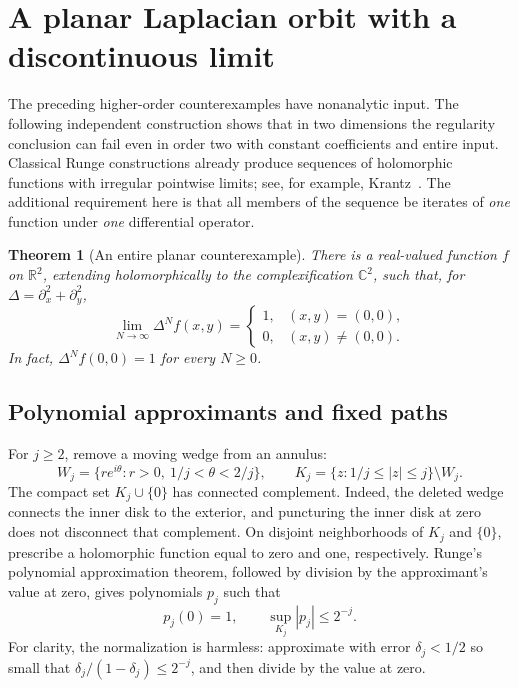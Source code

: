 \documentclass[11pt,reqno]{amsart}
\numberwithin{equation}{section}
\newtheorem{theorem}{Theorem}[section]
\theoremstyle{definition}
\theoremstyle{remark}
\newcommand{\R}{\mathbb R}
\newcommand{\C}{\mathbb C}
\begin{document}
\section{A planar Laplacian orbit with a discontinuous limit}\label{sec:plane}
The preceding higher-order counterexamples have nonanalytic input. The following independent construction shows that in two dimensions the regularity conclusion can fail even in order two with constant coefficients and entire input. Classical Runge constructions already produce sequences of holomorphic functions with irregular pointwise limits; see, for example, Krantz~\cite{krantz}. The additional requirement here is that all members of the sequence be iterates of \emph{one} function under \emph{one} differential operator.

\begin{theorem}[An entire planar counterexample]\label{thm:plane}
There is a real-valued function $f$ on $\R^2$, extending holomorphically to the complexification $\C^2$, such that, for $\Delta=\partial_x^2+\partial_y^2$,
\begin{equation}\label{eq:spike}
 \lim_{N\to\infty}\Delta^Nf(x,y)
 =\begin{cases}
 1,&(x,y)=(0,0),\\
 0,&(x,y)\ne(0,0).
 \end{cases}
\end{equation}
In fact, $\Delta^Nf(0,0)=1$ for every $N\ge0$.
\end{theorem}

\subsection{Polynomial approximants and fixed paths}
For $j\ge2$, remove a moving wedge from an annulus:
\[
 W_j=\{re^{i\theta}:r>0,\ 1/j<\theta<2/j\},\qquad
 K_j=\{z:1/j\le |z|\le j\}\setminus W_j.
\]
The compact set $K_j\cup\{0\}$ has connected complement. Indeed, the deleted wedge connects the inner disk to the exterior, and puncturing the inner disk at zero does not disconnect that complement. On disjoint neighborhoods of $K_j$ and $\{0\}$, prescribe a holomorphic function equal to zero and one, respectively. Runge's polynomial approximation theorem, followed by division by the approximant's value at zero, gives polynomials $p_j$ such that
\begin{equation}\label{eq:polyapprox}
 p_j(0)=1,\qquad \sup_{K_j}|p_j|\le2^{-j}.
\end{equation}
For clarity, the normalization is harmless: approximate with error $\delta_j<1/2$ so small that $\delta_j/(1-\delta_j)\le2^{-j}$, and then divide by the value at zero.
\end{document}
